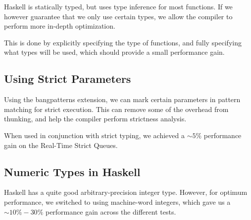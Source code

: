 Haskell is statically typed, but uses type inference for most functions. If we however guarantee that we only use certain types, we allow the compiler to perform more in-depth optimization. 

This is done by explicitly specifying the type of functions, and fully specifying what types will be used, which should provide a small performance gain.

\subsection{Using Strict Parameters}

Using the bangpatterns extension, we can mark certain parameters in pattern matching for strict execution. This can remove some of the overhead from thunking, and help the compiler perform strictness analysis.

When used in conjunction with strict typing, we achieved a $\sim 5\%$ performance gain on the Real-Time Strict Queues.

\subsection{Numeric Types in Haskell}

Haskell has a quite good arbitrary-precision integer type. However, for optimum performance, we switched to using machine-word integers, which gave us a $\sim 10\%-30\%$ performance gain across the different tests.

